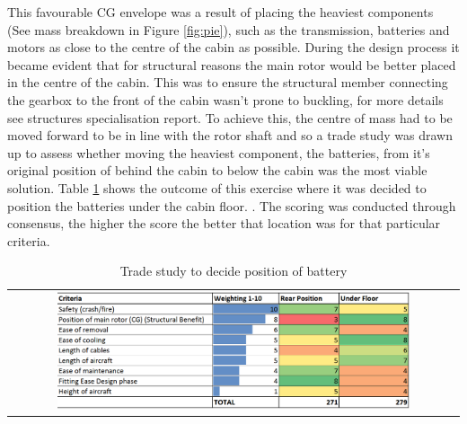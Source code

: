 \documentclass[11pt,a4paper]{article}
\begin{document}
This favourable CG envelope was a result of placing the heaviest components (See mass breakdown in Figure \ref{fig:pie}), such as the transmission, batteries and motors as close to the centre of the cabin as possible. During the design process it became evident that for structural reasons the main rotor would be better placed in the centre of the cabin. This was to ensure the structural member connecting the gearbox to the front of the cabin wasn't prone to buckling, for more details see structures specialisation report. To achieve this, the centre of mass had to be moved forward to be in line with the rotor shaft and so a trade study was drawn up to assess whether moving the heaviest component, the batteries, from it's original position of behind the cabin to below the cabin was the most viable solution. Table \ref{fig:batterypos} shows the outcome of this exercise where it was decided to position the batteries under the cabin floor. . The scoring was conducted through consensus, the higher the score the better that location was for that particular criteria. 

\begin{table}[H]
    \centering
    \caption{Trade study to decide position of battery}
    \begin{tabular}{c}
	\includegraphics[width=0.8\textwidth]{batterypos.PNG}
    \end{tabular}
    \label{fig:batterypos}
\end{table}{}
\end{document}
